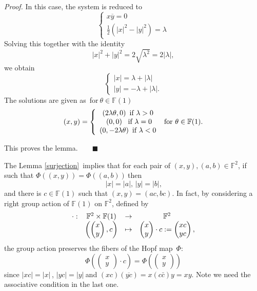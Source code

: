 \documentclass[a4paper]{article}%
\newenvironment{proof}[1][Proof]{\noindent\textit{#1.} }{}
\begin{document}
\begin{proof}
In this case, the system is reduced to
\[%
\begin{cases}
x\overline{y}=0\\
\frac{1}{2}(\left\vert x\right\vert ^{2}-\left\vert y\right\vert ^{2})=\lambda
\end{cases}
\]
Solving this together with the identity
\[
\left\vert x\right\vert ^{2}+\left\vert y\right\vert ^{2}=2\sqrt{\lambda^{2}%
}=2|\lambda|,
\]
we obtain
\[%
\begin{cases}
\left\vert x\right\vert =\lambda+|\lambda|\\
\left\vert y\right\vert =-\lambda+|\lambda|.
\end{cases}
\]
The solutions are given as\ for$\ \theta\in\mathbb{F}(1)$
\[
(x,y)=\left\{
\begin{array}
[c]{c}%
\left(  2\lambda\theta,0\right)  \ \text{if }\lambda>0\text{ }\\
\left(  0,0\right)  \ \ \text{if }\lambda=0\\
\left(  0,-2\lambda\theta\right)  \ \text{if }\lambda<0\text{ }%
\end{array}
\right.  \text{for}\ \theta\in\mathbb{F}(1).
\]


This proves the lemma.\ \ \ \ $\blacksquare$
\end{proof}

The Lemma \ref{surjection}\ implies that for each pair of $\left(  x,y\right)
,\left(  a,b\right)  \in\mathbb{F}^{2}$, if such that $\Phi\left(  \left(
x,y\right)  \right)  =\Phi\left(  \left(  a,b\right)  \right)  \ $then
\[
\left\vert x\right\vert =\left\vert a\right\vert \text{, }\left\vert
y\right\vert =\left\vert b\right\vert \text{,}%
\]
and there is $c\in\mathbb{F}(1)$ such that $\left(  x,y\right)  =\left(
ac,bc\right)  $. In fact, by considering a right group action of
$\mathbb{F}(1)$ on $\mathbb{F}^{2}$, defined by%
\[%
\begin{array}
[c]{cccc}%
\cdot: & \mathbb{F}^{2}\times\mathbb{F}(1) & \rightarrow & \mathbb{F}^{2}\\
& \left(
\begin{pmatrix}
x\\
y
\end{pmatrix}
,c\right)  & \mapsto &
\begin{pmatrix}
x\\
y
\end{pmatrix}
\cdot c:=%
\begin{pmatrix}
xc\\
yc
\end{pmatrix}
,
\end{array}
\]
the group action preserves the fibers of the Hopf map\ $\Phi$:
\[
\Phi\left(
\begin{pmatrix}
x\\
y
\end{pmatrix}
\cdot c\right)  =\Phi\left(
\begin{pmatrix}
x\\
y
\end{pmatrix}
\right)
\]
since $\left\vert xc\right\vert =\left\vert x\right\vert \,$, $\left\vert
yc\right\vert =\left\vert y\right\vert \ $and $\left(  xc\right)  \left(
\overline{yc}\right)  =x\left(  c\bar{c}\right)  y=xy$. Note we need the
associative condition in the last one.
\end{document}
